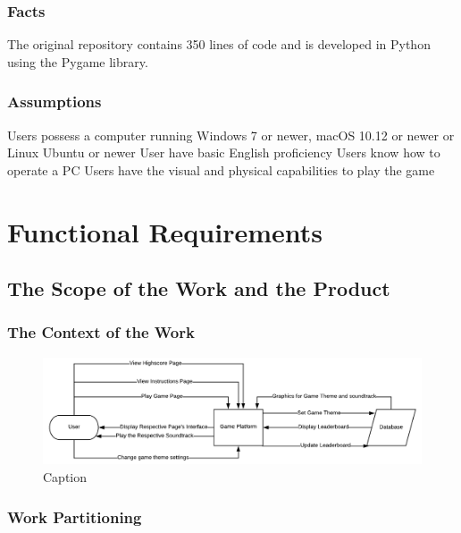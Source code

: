 \documentclass{article}
\begin{document}
\subsubsection{Facts}
The original repository contains 350 lines of code and is developed in Python using the Pygame library. 
\subsubsection{Assumptions}
Users possess a computer running Windows 7 or newer, macOS 10.12 or newer or Linux Ubuntu or newer
User have basic English proficiency 
Users know how to operate a PC
Users have the visual and physical capabilities to play the game



\section{Functional Requirements}

\subsection{The Scope of the Work and the Product}


\subsubsection{The Context of the Work}
\begin{figure}[!ht]
	\centering
	\includegraphics{context_diagram.png}
	\caption{Caption}
\end{figure}
\subsubsection{Work Partitioning}
\end{document}
